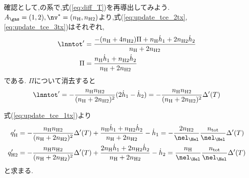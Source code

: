 確認として,の系で,式(\ref{eq:diff_T})を再導出してみよう. $A_\gas = (1, 2), \nv^\ast = (n_\mathrm{H}, n_\mathrm{H2})$より,式(\ref{eq:update_tce_2tx},\ref{eq:update_tce_3tx})はそれぞれ,
\begin{align}
\lnntot^\prime &= \frac{- (n_\mathrm{H} + 4 n_\mathrm{H2}) \Pi + n_\mathrm{H} \dot{h}_1 + 2 n_\mathrm{H2} \dot{h}_2 }{n_\mathrm{H} + 2 n_\mathrm{H2}} \\
\Pi &= \frac{n_\mathrm{H} \dot{h}_1 + n_\mathrm{H2} \dot{h}_2}{n_\mathrm{H} + 2 n_\mathrm{H2}} 
\end{align}
である. $\Pi$について消去すると
\begin{align}
 \lnntot^\prime = - \frac{n_\mathrm{H} n_\mathrm{H2}}{(n_\mathrm{H} + 2 n_\mathrm{H2})^2} (2 \dot{h}_1 - \dot{h}_2)  =  - \frac{n_\mathrm{H} n_\mathrm{H2}}{(n_\mathrm{H} + 2 n_\mathrm{H2})^2} \Delta^\prime (T)
\end{align}



式(\ref{eq:update_tce_1tx})より
\begin{align}
\label{eq:update_tce_1txc}
    q^\prime_\mathrm{H} &= - \frac{n_\mathrm{H} n_\mathrm{H2}}{(n_\mathrm{H} + 2 n_\mathrm{H2})^2} \Delta^\prime (T) + \frac{n_\mathrm{H} \dot{h}_1 + n_\mathrm{H2} \dot{h}_2}{n_\mathrm{H} + 2 n_\mathrm{H2}} - \dot{h}_1 
    = - \frac{2 n_\mathrm{H2}}{\nel_\Hel} \frac{n_\mathrm{tot} }{\nel_\Hel} \Delta^\prime (T) 
    \\
    q^\prime_\mathrm{H2} &= - \frac{n_\mathrm{H} n_\mathrm{H2}}{(n_\mathrm{H} + 2 n_\mathrm{H2})^2} \Delta^\prime (T) + \frac{2 n_\mathrm{H} \dot{h}_1 + 2 n_\mathrm{H2} \dot{h}_2}{n_\mathrm{H} + 2 n_\mathrm{H2}} - \dot{h}_2 
     = \frac{n_\mathrm{H}}{\nel_\Hel} \frac{n_\mathrm{tot} }{\nel_\Hel} \Delta^\prime (T) 
\end{align}
と求まる. 


